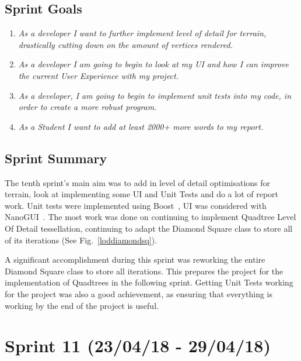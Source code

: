 \documentclass[a4paper,10pt]{report}
\begin{document}
\subsection{Sprint Goals}

\begin{enumerate}

    \item \textit{As a developer I want to further implement level of detail for terrain, drastically cutting down on the amount of vertices rendered.}

    \item \textit{As a developer I am going to begin to look at my UI and how I can improve the current User Experience with my project.}

    \item \textit{As a developer, I am going to begin to implement unit tests into my code, in order to create a more robust program. }
    \item \textit{As a Student I want to add at least 2000+ more words to my report.}

\end{enumerate}

\subsection{Sprint Summary}

The tenth sprint's main aim was to add in level of detail optimisations for terrain, look at implementing some UI and Unit Tests and do a lot of report work. Unit tests were implemented using Boost~\cite{boost}, UI was considered with NanoGUI~\cite{nanogui}. The most work was done on continuing to implement Quadtree Level Of Detail tessellation, continuing to adapt the Diamond Square class to store all of its iterations (See Fig.~\ref{loddiamondsq}). \medskip

A significant accomplishment during this sprint was reworking the entire Diamond Square class to store all iterations. This prepares the project for the implementation of Quadtrees in the following sprint. Getting Unit Tests working for the project was also a good achievement, as ensuring that everything is working by the end of the project is useful.


\clearpage
\section{Sprint 11 (23/04/18 -  29/04/18)}
\end{document}

